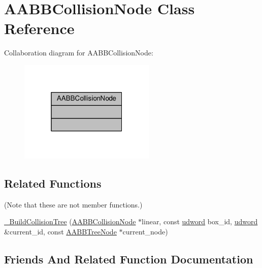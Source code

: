 \hypertarget{classAABBCollisionNode}{}\section{A\+A\+B\+B\+Collision\+Node Class Reference}
\label{classAABBCollisionNode}


Collaboration diagram for A\+A\+B\+B\+Collision\+Node\+:
\nopagebreak
\begin{figure}[H]
\begin{center}
\leavevmode
\includegraphics[width=184pt]{d6/dd8/classAABBCollisionNode__coll__graph}
\end{center}
\end{figure}
\subsection*{Related Functions}
(Note that these are not member functions.) \begin{DoxyCompactItemize}
\item 
\hyperlink{classAABBCollisionNode_ada461a1e7da4f92ef39f9a6aa4a012b8}{\+\_\+\+Build\+Collision\+Tree} (\hyperlink{classOpcode_1_1AABBCollisionNode}{A\+A\+B\+B\+Collision\+Node} $\ast$linear, const \hyperlink{IceTypes_8h_a44c6f1920ba5551225fb534f9d1a1733}{udword} box\+\_\+id, \hyperlink{IceTypes_8h_a44c6f1920ba5551225fb534f9d1a1733}{udword} \&current\+\_\+id, const \hyperlink{classOpcode_1_1AABBTreeNode}{A\+A\+B\+B\+Tree\+Node} $\ast$current\+\_\+node)
\end{DoxyCompactItemize}


\subsection{Friends And Related Function Documentation}

